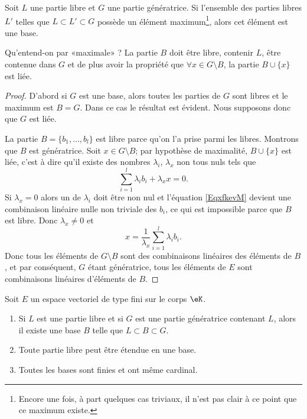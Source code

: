 \begin{lemma}   \label{LemkUfzHl}
    Soit \( L\) une partie libre et \( G\) une partie génératrice. Si l'ensemble des parties libres \( L'\) telles que \( L\subset L'\subset G\) possède un élément maximum\footnote{Encore une fois, à part quelques cas triviaux, il n'est pas clair à ce point que ce maximum existe.}, alors cet élément est une base.
\end{lemma}
Qu'entend-on par «maximale» ? La partie \( B\) doit être libre, contenir \( L\), être contenue dans \( G\) et de plus avoir la propriété que \( \forall x\in G\setminus B\), la partie \( B\cup\{ x \}\) est liée.

\begin{proof}
    D'abord si \( G\) est une base, alors toutes les parties de \( G\) sont libres et le maximum est \( B=G\). Dans ce cas le résultat est évident. Nous supposons donc que \( G\) est liée.

    La partie \( B=\{ b_1,\ldots, b_l \}\) est libre parce qu'on l'a prise parmi les libres. Montrons que \( B\) est génératrice. Soit \( x\in G\setminus B\); par hypothèse de maximalité, \( B\cup\{ x \}\) est liée, c'est à dire qu'il existe des nombres \( \lambda_i\), \( \lambda_x\) non tous nuls tels que
    \begin{equation}    \label{EqxfkevM}
        \sum_{i=1}^l\lambda_ib_i+\lambda_xx=0.
    \end{equation}
    Si \( \lambda_x=0\) alors un de \( \lambda_i\) doit être non nul et l'équation \eqref{EqxfkevM} devient une combinaison linéaire nulle non triviale des \( b_i\), ce qui est impossible parce que \( B\) est libre. Donc \( \lambda_x\neq 0\) et
    \begin{equation}
        x=\frac{1}{ \lambda_x }\sum_{i=1}^l\lambda_ib_i.
    \end{equation}
    Donc tous les éléments de \( G\setminus B\) sont des combinaisons linéaires des éléments de \( B\), et par conséquent, \( G\) étant génératrice, tous les éléments de \( E\) sont combinaisons linéaires d'éléments de \( B\).
\end{proof}

\begin{theorem} \label{ThonmnWKs}
    Soit \( E\) un espace vectoriel de type fini sur le corps \( \eK\).
    \begin{enumerate}
        \item     \label{ItemBazxTZ}
            Si \( L\) est une partie libre et si \( G\) est une partie génératrice contenant \( L\), alors il existe une base \( B\) telle que \( L\subset B\subset G\).
        \item     \label{ITEMooFVJXooGzzpOu}
            Toute partie libre peut être étendue en une base.
        \item     \label{ITEMooFBUAooSSZxgx}
            Toutes les bases sont finies et ont même cardinal.
    \end{enumerate}
\end{theorem}

